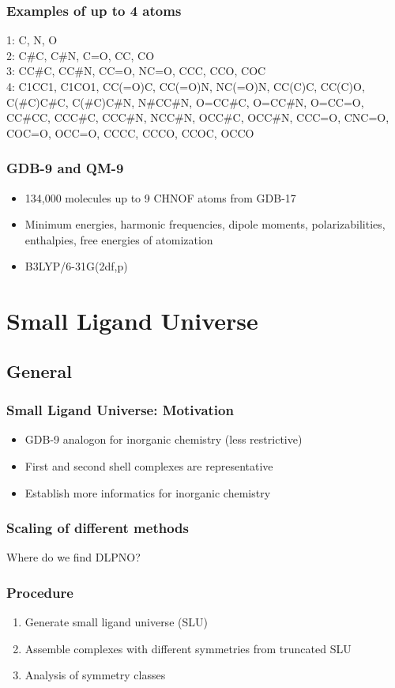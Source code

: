 \documentclass[xcolor=dvipsnames]{beamer}
\begin{document}
\begin{frame}
\frametitle{Examples of up to 4 atoms}
1: C, N, O\\
2: C\#C, C\#N, C=O, CC, CO\\
3: CC\#C, CC\#N, CC=O, NC=O, CCC, CCO, COC\\
4: C1CC1, C1CO1, CC(=O)C, CC(=O)N, NC(=O)N, CC(C)C, CC(C)O, C(\#C)C\#C, C(\#C)C\#N, N\#CC\#N, O=CC\#C, O=CC\#N, O=CC=O, CC\#CC, CCC\#C, CCC\#N, NCC\#N, OCC\#C, OCC\#N, CCC=O, CNC=O, COC=O, OCC=O, CCCC, CCCO, CCOC, OCCO
\end{frame}

\begin{frame}
\frametitle{GDB-9 and QM-9}
\begin{itemize}
\item 134,000 molecules up to 9 CHNOF atoms from GDB-17
\item Minimum energies, harmonic frequencies, dipole moments, polarizabilities, enthalpies, free energies of atomization
\item B3LYP/6-31G(2df,p)
\end{itemize}


\end{frame}


\section{Small Ligand Universe}
\subsection{General}
\begin{frame}
\frametitle{Small Ligand Universe: Motivation}
\begin{itemize}
\item GDB-9 analogon for inorganic chemistry (less restrictive)
\item First and second shell complexes are representative
\item Establish more informatics for inorganic chemistry
\end{itemize}
\end{frame}

\begin{frame}\frametitle{Scaling of different methods}
Where do we find DLPNO?

\end{frame}

\begin{frame}
\frametitle{Procedure}
\begin{enumerate}
\item Generate small ligand universe (SLU)
\item Assemble complexes with different symmetries from truncated SLU
\item Analysis of symmetry classes 
\end{enumerate}
\end{frame}
\end{document}
